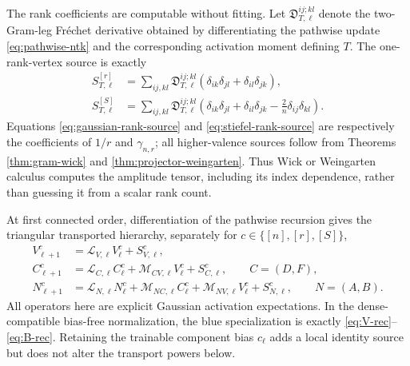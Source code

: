 \documentclass{article}
\begin{document}
The rank coefficients are computable without fitting.  Let
\(\mathfrak D_{T,\ell}^{ij;kl}\) denote the two-Gram-leg Fr\'echet derivative
obtained by differentiating the pathwise update \eqref{eq:pathwise-ntk} and
the corresponding activation moment defining \(T\).  The one-rank-vertex
source is exactly
\begin{align}
S_{T,\ell}^{[r]}
&=\sum_{ij,kl}\mathfrak D_{T,\ell}^{ij;kl}
(\delta_{ik}\delta_{jl}+\delta_{il}\delta_{jk}),
\label{eq:gaussian-rank-source}\\
S_{T,\ell}^{[S]}
&=\sum_{ij,kl}\mathfrak D_{T,\ell}^{ij;kl}
\left(\delta_{ik}\delta_{jl}+\delta_{il}\delta_{jk}
-\frac2n\delta_{ij}\delta_{kl}\right).
\label{eq:stiefel-rank-source}
\end{align}
Equations \eqref{eq:gaussian-rank-source} and
\eqref{eq:stiefel-rank-source} are respectively the coefficients of \(1/r\)
and \(\gamma_{n,r}\); all higher-valence sources follow from Theorems
\ref{thm:gram-wick} and \ref{thm:projector-weingarten}.  Thus Wick or
Weingarten calculus computes the amplitude tensor, including its index
dependence, rather than guessing it from a scalar rank count.

At first connected order, differentiation of the pathwise recursion gives
the triangular transported hierarchy, separately for
\(c\in\{[n],[r],[S]\}\),
\begin{align}
V^{c}_{\ell+1}&=\mathcal L_{V,\ell}V^c_\ell+S^c_{V,\ell},
\label{eq:mmnn-V-hierarchy}\\
C^{c}_{\ell+1}&=\mathcal L_{C,\ell}C^c_\ell
+\mathcal M_{CV,\ell}V^c_\ell+S^c_{C,\ell},
\qquad C=(D,F),
\label{eq:mmnn-C-hierarchy}\\
N^{c}_{\ell+1}&=\mathcal L_{N,\ell}N^c_\ell
+\mathcal M_{NC,\ell}C^c_\ell
+\mathcal M_{NV,\ell}V^c_\ell+S^c_{N,\ell},
\qquad N=(A,B).
\label{eq:mmnn-N-hierarchy}
\end{align}
All operators here are explicit Gaussian activation expectations.  In the
dense-compatible bias-free normalization, the blue specialization is
exactly \eqref{eq:V-rec}--\eqref{eq:B-rec}.  Retaining the trainable component
bias \(c_\ell\) adds a local identity source but does not alter the transport
powers below.
\end{document}
